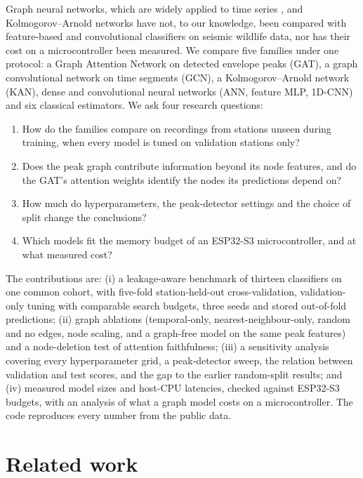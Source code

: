 \documentclass[a4paper,fleqn]{cas-dc}
\begin{document}
Graph neural networks, which are widely applied to time series \citep{jin2024}, and
Kolmogorov--Arnold networks \citep{liu2024kan} have not, to our knowledge, been compared
with feature-based and convolutional classifiers on seismic wildlife data, nor has their
cost on a microcontroller been measured. We compare five families under one protocol:
a Graph Attention Network on detected envelope peaks (GAT), a graph convolutional network
on time segments (GCN), a Kolmogorov--Arnold network (KAN), dense and convolutional
neural networks (ANN, feature MLP, 1D-CNN) and six classical estimators. We ask four
research questions:
\begin{enumerate}
\item[RQ1] How do the families compare on recordings from stations unseen during
training, when every model is tuned on validation stations only?
\item[RQ2] Does the peak graph contribute information beyond its node features, and do
the GAT's attention weights identify the nodes its predictions depend on?
\item[RQ3] How much do hyperparameters, the peak-detector settings and the choice of
split change the conclusions?
\item[RQ4] Which models fit the memory budget of an ESP32-S3 microcontroller, and at
what measured cost?
\end{enumerate}

The contributions are: (i) a leakage-aware benchmark of thirteen classifiers on one
common cohort, with five-fold station-held-out cross-validation, validation-only tuning
with comparable search budgets, three seeds and stored out-of-fold predictions;
(ii) graph ablations (temporal-only, nearest-neighbour-only, random and no edges, node
scaling, and a graph-free model on the same peak features) and a node-deletion test of
attention faithfulness; (iii) a sensitivity analysis covering every hyperparameter grid,
a peak-detector sweep, the relation between validation and test scores, and the gap to
the earlier random-split results; and (iv) measured model sizes and host-CPU latencies,
checked against ESP32-S3 budgets, with an analysis of what a graph model costs on a
microcontroller. The code reproduces every number from the public data.

\section{Related work}\label{sec:related}
\end{document}
